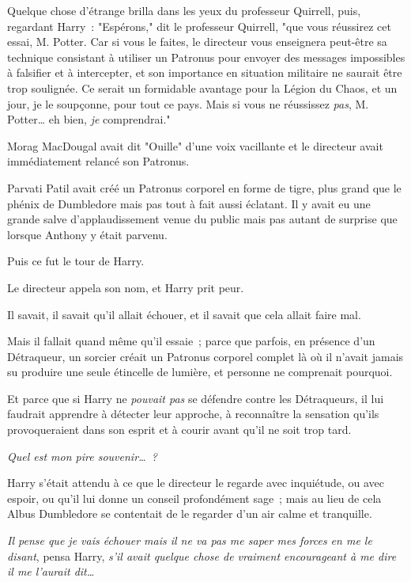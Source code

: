 Quelque chose d'étrange brilla dans les yeux du professeur Quirrell, puis, regardant Harry~: "Espérons," dit le professeur Quirrell, "que vous réussirez cet essai, M. Potter. Car si vous le faites, le directeur vous enseignera peut-être sa technique consistant à utiliser un Patronus pour envoyer des messages impossibles à falsifier et à intercepter, et son importance en situation militaire ne saurait être trop soulignée. Ce serait un formidable avantage pour la Légion du Chaos, et un jour, je le soupçonne, pour tout ce pays. Mais si vous ne réussissez \emph{pas}, M. Potter… eh bien, \emph{je} comprendrai."

\later

Morag MacDougal avait dit "Ouille" d'une voix vacillante et le directeur avait immédiatement relancé son Patronus.

Parvati Patil avait créé un Patronus corporel en forme de tigre, plus grand que le phénix de Dumbledore mais pas tout à fait aussi éclatant. Il y avait eu une grande salve d'applaudissement venue du public mais pas autant de surprise que lorsque Anthony y était parvenu.

Puis ce fut le tour de Harry.

Le directeur appela son nom, et Harry prit peur.

Il savait, il savait qu'il allait échouer, et il savait que cela allait faire mal.

Mais il fallait quand même qu'il essaie~; parce que parfois, en présence d'un Détraqueur, un sorcier créait un Patronus corporel complet là où il n'avait jamais su produire une seule étincelle de lumière, et personne ne comprenait pourquoi.

Et parce que si Harry ne \emph{pouvait pas} se défendre contre les Détraqueurs, il lui faudrait apprendre à détecter leur approche, à reconnaître la sensation qu'ils provoqueraient dans son esprit et à courir avant qu'il ne soit trop tard.

\emph{Quel est mon pire souvenir…~?}

Harry s'était attendu à ce que le directeur le regarde avec inquiétude, ou avec espoir, ou qu'il lui donne un conseil profondément sage~; mais au lieu de cela Albus Dumbledore se contentait de le regarder d'un air calme et tranquille.

\emph{Il pense que je vais échouer mais il ne va pas me saper mes forces en me le disant}, pensa Harry, \emph{s'il avait quelque chose de vraiment encourageant à me dire il me l'aurait dit…}

